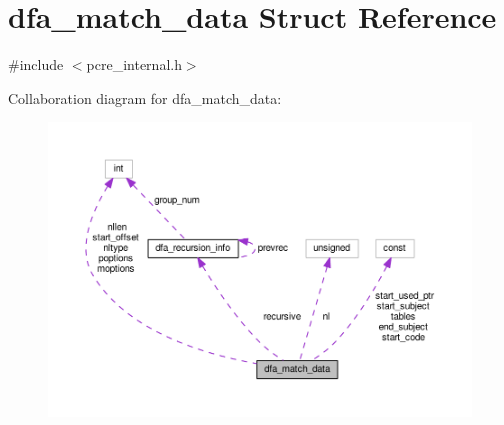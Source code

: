 \hypertarget{structdfa__match__data}{}\section{dfa\+\_\+match\+\_\+data Struct Reference}
\label{structdfa__match__data}


{\ttfamily \#include $<$pcre\+\_\+internal.\+h$>$}



Collaboration diagram for dfa\+\_\+match\+\_\+data\+:
\nopagebreak
\begin{figure}[H]
\begin{center}
\leavevmode
\includegraphics[width=350pt]{structdfa__match__data__coll__graph}
\end{center}
\end{figure}

